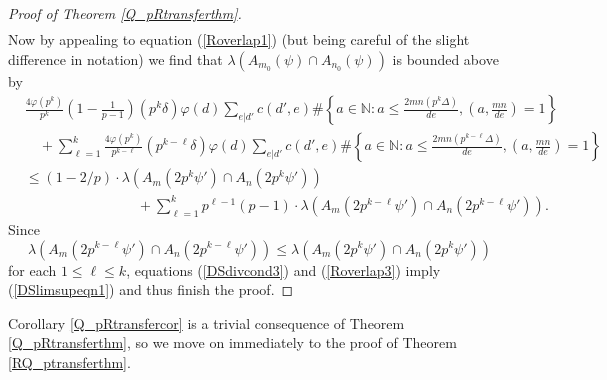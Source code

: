 \documentclass[12pt,reqno]{amsart}
\begin{document}
\begin{proof}[Proof of Theorem \ref{Q_pRtransferthm}]
\begin{align*}
\end{align*}
Now by appealing to equation (\ref{Roverlap1}) (but being careful of the slight difference in notation) we find that $\lambda (A_{m_0}(\psi)\cap A_{n_0}(\psi))$ is bounded above by
\begin{align}
&\frac{4\varphi (p^k)}{p^k}\left(1-\frac{1}{p-1}\right)(p^k\delta)\varphi (d)\sum_{e|d'}c(d',e)\#\left\{a\in{\mathbb{N}} :a\le\frac{2mn(p^k\Delta)}{de}, \left(a,\frac{mn}{de}\right)=1\right\}\nonumber\\
&\quad+\sum_{\ell=1}^k\frac{4\varphi (p^k)}{p^{k-\ell}}(p^{k-\ell}\delta)\varphi (d)\sum_{e|d'}c(d',e)\#\left\{a\in{\mathbb{N}} :a\le\frac{2mn(p^{k-\ell}\Delta)}{de}, \left(a,\frac{mn}{de}\right)=1\right\}\nonumber\\
&\le (1-2/p)\cdot\lambda (A_m(2p^k\psi')\cap A_n(2p^k\psi'))\label{Roverlap3}\\
&\qquad\qquad\qquad\qquad+\sum_{\ell=1}^kp^{\ell-1}(p-1)\cdot\lambda (A_m(2p^{k-\ell}\psi')\cap A_n(2p^{k-\ell}\psi')).\nonumber
\end{align}
Since
\[\lambda (A_m(2p^{k-\ell}\psi')\cap A_n(2p^{k-\ell}\psi'))\le\lambda (A_m(2p^k\psi')\cap A_n(2p^k\psi'))\]
for each $1\le\ell\le k$, equations (\ref{DSdivcond3}) and (\ref{Roverlap3}) imply (\ref{DSlimsupeqn1}) and thus finish the proof.
\end{proof}
Corollary \ref{Q_pRtransfercor} is a trivial consequence of Theorem \ref{Q_pRtransferthm}, so we move on immediately to the proof of Theorem \ref{RQ_ptransferthm}.
\end{document}
